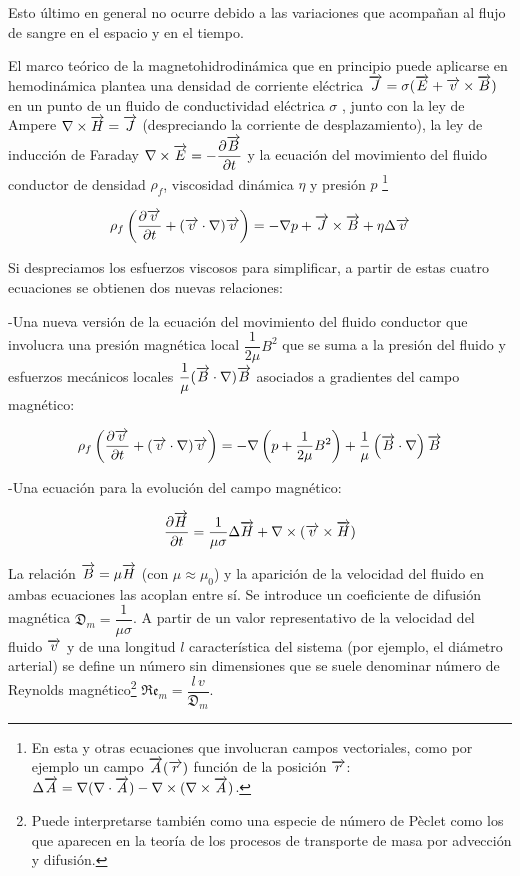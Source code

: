 Esto último en general no ocurre debido a las variaciones que acompañan al flujo de sangre en el espacio y en el tiempo.

El marco teórico de la magnetohidrodinámica que en principio puede aplicarse en hemodinámica plantea una densidad de corriente eléctrica $\overrightarrow{J}=\sigma(\overrightarrow{E}+\overrightarrow{v}\times\overrightarrow{B})$ en un punto de un fluido de conductividad eléctrica $\sigma$ , junto con la ley de Ampere $\nabla \times \overrightarrow{H} = \overrightarrow{J}$ (despreciando la corriente de desplazamiento), la ley de inducción de Faraday $\nabla\times\overrightarrow{E}=-\dfrac{\partial \overrightarrow{B}}{\partial t}$ y la ecuación del movimiento del fluido conductor de densidad $\rho_{f}$, viscosidad dinámica $\eta$ y presión $p$ \footnote{En esta y otras ecuaciones que involucran campos vectoriales, como por ejemplo un campo $\overrightarrow{A}(\overrightarrow{r})$ función de la posición $\overrightarrow{r}$: $\Delta \overrightarrow{A} = \nabla(\nabla\cdot \overrightarrow{A})-\nabla\times(\nabla\times\overrightarrow{A})$.}

\begin{equation}
	\label{eq:620}
	\rho_{f}\left(\dfrac{\partial \overrightarrow{v}}{\partial t} +(\overrightarrow{v}\cdot \nabla)\overrightarrow{v} \right) = -\nabla p + \overrightarrow{J} \times \overrightarrow{B}+ \eta\Delta \overrightarrow{v}
\end{equation}


Si despreciamos los esfuerzos viscosos para simplificar, a partir de estas cuatro ecuaciones se obtienen dos nuevas relaciones:

-Una nueva versión de la ecuación del movimiento del fluido conductor que involucra una presión magnética local $\dfrac{1}{2\mu}B^{2}$ que se suma a la presión del fluido y esfuerzos mecánicos locales $\dfrac{1}{\mu}(\overrightarrow{B}\cdot \nabla)\overrightarrow{B}$ asociados a gradientes del campo magnético:

\begin{equation}
	\label{eq:621}
	\rho_{f}\left(\dfrac{\partial \overrightarrow{v}}{\partial t} +(\overrightarrow{v}\cdot \nabla)\overrightarrow{v} \right) = -\nabla \left(  p + \dfrac{1}{2\mu}B^{2}\right) +\dfrac{1}{\mu}\left(\overrightarrow{B}\cdot\nabla \right) \overrightarrow{B}
\end{equation}

-Una ecuación para la evolución del campo magnético:

\begin{equation}
	\label{eq:622}
	\dfrac{\partial \overrightarrow{H}}{\partial t} = \dfrac{1}{\mu\sigma}\Delta \overrightarrow{H} + \nabla\times(\overrightarrow{v}\times\overrightarrow{H})
\end{equation}

La relación $\overrightarrow{B}=\mu\overrightarrow{H}$ (con $\mu\approx\mu_{0}$) y la aparición de la velocidad  del fluido en ambas ecuaciones las acoplan entre sí.
Se introduce un coeficiente de difusión magnética ${\mathfrak{D}}_{m}=\dfrac{1}{\mu\sigma}$.
A partir de un valor representativo de la velocidad del fluido $\overrightarrow{v}$ y de una longitud $l$ característica del sistema (por ejemplo, el diámetro arterial) se define un número sin dimensiones que se suele denominar número de Reynolds magnético\footnote{Puede interpretarse también como una especie de número de Pèclet como los que aparecen en la teoría de los procesos de transporte de masa por advección y difusión.} ${\mathfrak{Re}}_{m}=\dfrac{l\,v}{{\mathfrak{D}}_{m}}$.


